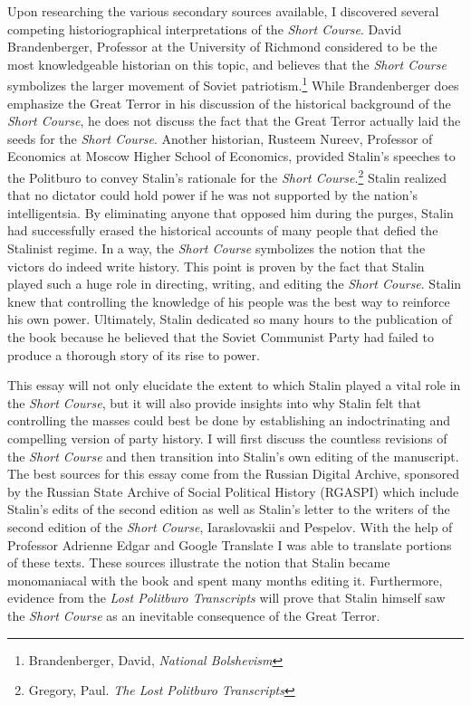 \documentclass[a4paper, twocolumn]{article}
\begin{document}
Upon researching the various secondary sources available, I discovered
several competing historiographical interpretations of the \emph{Short
Course}. David Brandenberger, Professor at the University of Richmond
considered to be the most knowledgeable historian on this topic, and
believes that the \emph{Short Course} symbolizes the larger movement of
Soviet patriotism.\footnote{Brandenberger, David, \emph{National Bolshevism}} While Brandenberger does emphasize the Great
Terror in his discussion of the historical background of the \emph{Short
Course}, he does not discuss the fact that the Great Terror actually
laid the seeds for the \emph{Short Course}. Another historian, Rusteem
Nureev, Professor of Economics at Moscow Higher School of Economics,
provided Stalin's speeches to the Politburo to convey Stalin's
rationale for the \emph{Short Course}.\footnote{Gregory, Paul. \emph{The Lost Politburo Transcripts}} Stalin realized that no dictator
could hold power if he was not supported by the nation's
intelligentsia. By eliminating anyone that opposed him during the
purges, Stalin had successfully erased the historical accounts of many
people that defied the Stalinist regime. In a way, the \emph{Short Course}
symbolizes the notion that the victors do indeed write history. This
point is proven by the fact that Stalin played such a huge role in
directing, writing, and editing the \emph{Short Course}. Stalin knew that
controlling the knowledge of his people was the best way to reinforce
his own power. Ultimately, Stalin dedicated so many hours to the
publication of the book because he believed that the Soviet Communist Party
had failed to produce a thorough story of its rise to power.

This essay will not only elucidate the extent to which Stalin played a
vital role in the \emph{Short Course}, but it will also provide insights into
why Stalin felt that controlling the masses could best be done by
establishing an indoctrinating and compelling version of party
history. I will first discuss the countless revisions of the \emph{Short
Course} and then transition into Stalin's own editing of the
manuscript. The best sources for this essay come from the Russian
Digital Archive, sponsored by the Russian State Archive of Social
Political History (RGASPI) which include Stalin’s edits of the second
edition as well as Stalin's letter to the writers of the second
edition of the \emph{Short Course}, Iaraslovaskii and Pespelov. With the help
of Professor Adrienne Edgar and Google Translate I was able to
translate portions of these texts. These sources illustrate
the notion that Stalin became monomaniacal with the book and
spent many months editing it. Furthermore, evidence from the \emph{Lost
Politburo Transcripts} will prove that Stalin himself saw the
\emph{Short Course} as an inevitable consequence of the Great Terror.
\end{document}
